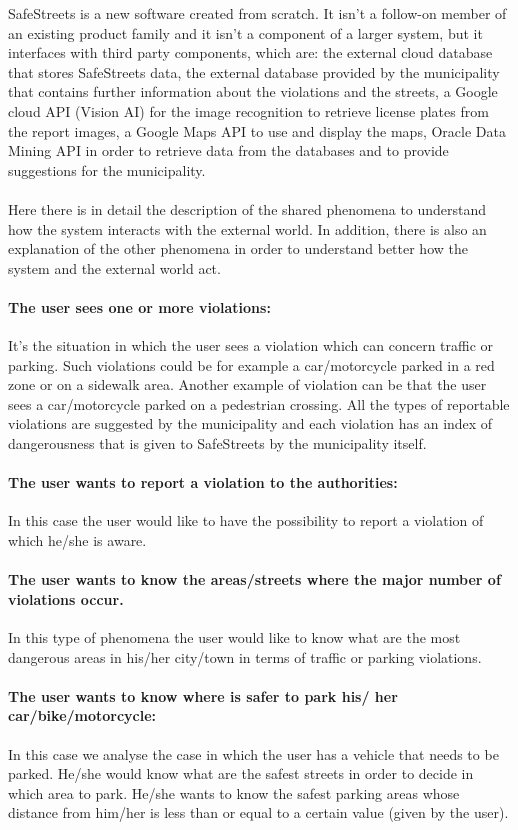 \documentclass[titlepage]{article}
\begin{document}
SafeStreets is a new software created from scratch. It isn't a follow-on member of an existing product family and it isn't a component of a larger system, but it interfaces with third party components, which are: the external cloud database that stores SafeStreets data, the external database provided by the municipality that contains further information about the violations and the streets, a Google cloud API (Vision AI) for the image recognition to retrieve license plates from the report images, a Google Maps API to use and display the maps, Oracle Data Mining API in order to retrieve data from the databases and to provide suggestions for the municipality.\\ \\

Here there is in detail the description of the shared phenomena to understand how the system interacts with the external world. In addition, there is also an explanation of the other phenomena in order to understand better how the system and the external world act. \\

\paragraph{The user sees one or more violations:}
It's the situation in which the user sees a violation which can concern traffic or parking. Such violations could be for example a car/motorcycle parked in a red zone or on a sidewalk area. Another example of violation can be that the user sees a car/motorcycle parked on a pedestrian crossing. All the types of reportable violations are suggested by the municipality and each violation has an index of dangerousness that is given to SafeStreets by the municipality itself.
\paragraph{The user wants to report a violation to the 					  authorities:}
In this case the user would like to have the possibility to report a violation of which he/she is aware. 
\paragraph{The user wants to know the areas/streets where the 
	      major number of violations occur.}
In this type of phenomena the user would like to know what are the most dangerous areas in his/her city/town in terms of traffic or parking violations. 
\paragraph{The user wants to know where is safer to park his/			  her car/bike/motorcycle:}
In this case we analyse the case in which the user has a vehicle that needs to be parked. He/she would know what are the safest streets in order to decide in which area to park. He/she wants to know the safest parking areas whose distance from him/her is less than or equal to a certain value (given by the user).
\end{document}
